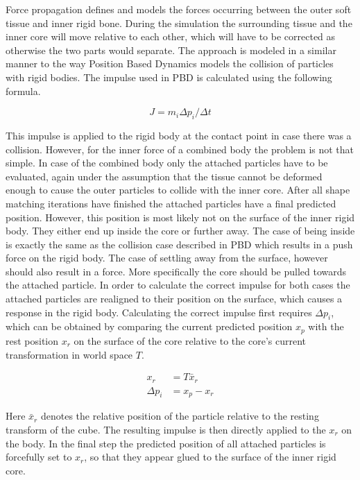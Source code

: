 Force propagation defines and models the forces occurring between the outer soft tissue and inner rigid bone. During the simulation the surrounding tissue and the inner core will move relative to each other, which will have to be corrected as otherwise the two parts would separate. The approach is modeled in a similar manner to the way Position Based Dynamics models the collision of particles with rigid bodies. The impulse used in PBD is calculated using the following formula.

\begin{equation}
J = m_i \Delta p_i/\Delta t
\end{equation}

This impulse is applied to the rigid body at the contact point in case there was a collision. However, for  the inner force of a combined body the problem is not that simple. In case of the combined body only the attached particles have to be evaluated, again under the assumption that the tissue cannot be deformed enough to cause the outer particles to collide with the inner core. After all shape matching iterations have finished the attached particles have a final predicted position. However, this position is most likely not on the surface of the inner rigid body. They either end up inside the core or further away. The case of being inside is exactly the same as the collision case described in PBD which results in a push force on the rigid body. The case of settling away from the surface, however should also result in a force. More specifically the core should be pulled towards the attached particle. In order to calculate the correct impulse for both cases the attached particles are realigned to their position on the surface, which causes a response in the rigid body. Calculating the correct impulse first requires $\Delta p_i$, which can be obtained by comparing the current predicted position $x_p$ with the rest position $x_r$ on the surface of the core relative to the core's current transformation in world space $T$.

\begin{align}
x_r &= T\bar{x}_r \\
\Delta p_i &= x_p - x_r
\end{align}

Here $\bar{x}_r$ denotes the relative position of the particle relative to the resting transform of the cube. The resulting impulse is then directly applied to the $x_r$ on the body. In the final step the predicted position of all attached particles is forcefully set to $x_r$, so that they appear glued to the surface of the inner rigid core.

